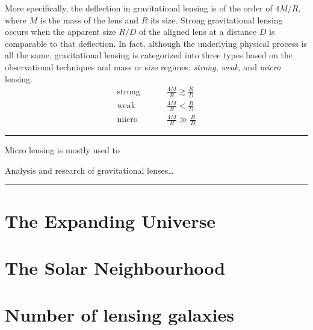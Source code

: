 More specifically, the deflection in gravitational lensing is of the order of
$4M/R$, where $M$ is the mass of the lens and $R$ its size.  Strong
gravitational lensing occurs when the apparent size $R/D$ of the aligned lens at
a distance $D$ is comparable to that deflection.  In fact, although the
underlying physical process is all the same, gravitational lensing is
categorized into three types based on the observational techniques and mass or
size regimes: \textit{strong}, \textit{weak}, and \textit{micro} lensing.
\begin{align}
    \text{strong} \hspace{1cm}&\frac{4M}{R} \gtrsim \frac{R}{D}\\
    \text{weak} \hspace{1cm}&\frac{4M}{R} < \frac{R}{D}\\
    \text{micro} \hspace{1cm}&\frac{4M}{R} \gg \frac{R}{D}
\end{align}

\par\noindent\rule{\textwidth}{0.8pt}

Micro lensing is mostly used to

Analysis and research of gravitational lenses\dots

\par\noindent\rule{\textwidth}{0.8pt}

\section{The Expanding Universe}


\section{The Solar Neighbourhood}


\section{Number of lensing galaxies}
